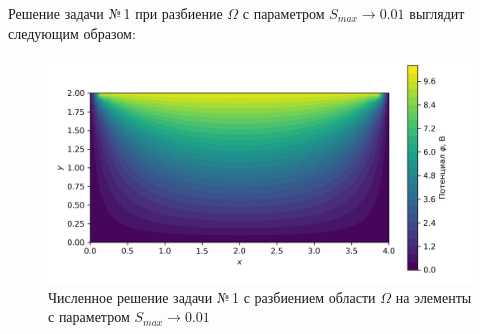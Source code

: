 \documentclass[12pt, a4paper]{article}
\begin{document}
			
			\newpage
			
			Решение задачи №\,1 при разбиение $\Omega$ с параметром $S_{max} \rightarrow 0.01$ выглядит следующим образом: 
			\vspace*{-5mm}
			\begin{figure}[!h]
				\centering
				\includegraphics[width=1\textwidth]{rect_dirichlet_only_001_calfem.png}
				\caption{Численное решение задачи №\,1 с разбиением области $\Omega$ на элементы с параметром $S_{max} \rightarrow 0.01$}
				\label{fig:dom_rect_001}
			\end{figure}
			
\end{document}
